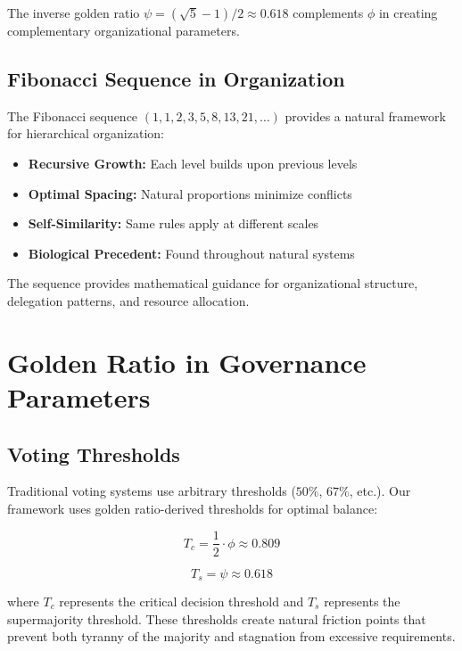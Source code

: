 \documentclass[AMA]{WileyNJD-AMA}
\begin{document}
The inverse golden ratio $\psi = (\sqrt{5}-1)/2 \approx 0.618$ complements $\phi$ in creating complementary organizational parameters.

\subsection{Fibonacci Sequence in Organization}

The Fibonacci sequence $(1, 1, 2, 3, 5, 8, 13, 21, \ldots)$ provides a natural framework for hierarchical organization:

\begin{itemize}
    \item \textbf{Recursive Growth:} Each level builds upon previous levels
    \item \textbf{Optimal Spacing:} Natural proportions minimize conflicts
    \item \textbf{Self-Similarity:} Same rules apply at different scales
    \item \textbf{Biological Precedent:} Found throughout natural systems
\end{itemize}

The sequence provides mathematical guidance for organizational structure, delegation patterns, and resource allocation.

\section{Golden Ratio in Governance Parameters}

\subsection{Voting Thresholds}

Traditional voting systems use arbitrary thresholds ($50\%$, $67\%$, etc.). Our framework uses golden ratio-derived thresholds for optimal balance:

\begin{equation}
    T_c = \frac{1}{2} \cdot \phi \approx 0.809
    \label{eq:critical_threshold}
\end{equation}

\begin{equation}
    T_s = \psi \approx 0.618
    \label{eq:supermajority}
\end{equation}

where $T_c$ represents the critical decision threshold and $T_s$ represents the supermajority threshold. These thresholds create natural friction points that prevent both tyranny of the majority and stagnation from excessive requirements.
\end{document}
